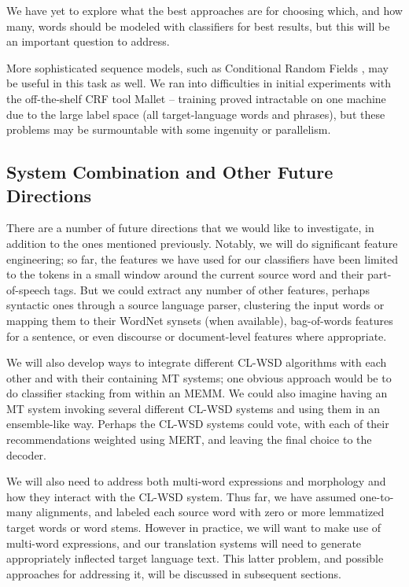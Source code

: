 We have yet to explore what the best approaches are for choosing which, and how
many, words should be modeled with classifiers for best results, but this will
be an important question to address.

More sophisticated sequence models, such as Conditional Random Fields
\cite{lafferty2001conditional}, may be useful in this task as well. 
We ran into difficulties in initial experiments with the off-the-shelf
CRF tool Mallet \cite{McCallumMALLET} -- training proved intractable on
one machine due to the large label space (all target-language words and
phrases), but these problems may be surmountable with some ingenuity or
parallelism.

\subsection{System Combination and Other Future Directions}

There are a number of future directions that we would like to investigate, in
addition to the ones mentioned previously.
Notably, we will do significant feature engineering; so far, the features we
have used for our classifiers have been limited to the tokens in a small window
around the current source word and their part-of-speech tags.
But we could extract any number of other features, perhaps syntactic ones
through a source language parser, clustering the input words or mapping them to
their WordNet synsets (when available), bag-of-words features for a sentence,
or even discourse or document-level features where appropriate.

We will also develop ways to integrate different CL-WSD algorithms with each
other and with their containing MT systems; one obvious approach would be to do
classifier stacking from within an MEMM.
We could also imagine having an MT system invoking several different CL-WSD
systems and using them in an ensemble-like way.
Perhaps the CL-WSD systems could vote, with each of their recommendations
weighted using MERT, and leaving the final choice to the decoder.

We will also need to address both multi-word expressions and morphology and how
they interact with the CL-WSD system.
Thus far, we have assumed one-to-many alignments, and labeled each source word
with zero or more lemmatized target words or word stems.
However in practice, we will want to make use of multi-word expressions, and
our translation systems will need to generate appropriately inflected target
language text. This latter problem, and possible approaches for addressing it,
will be discussed in subsequent sections.

